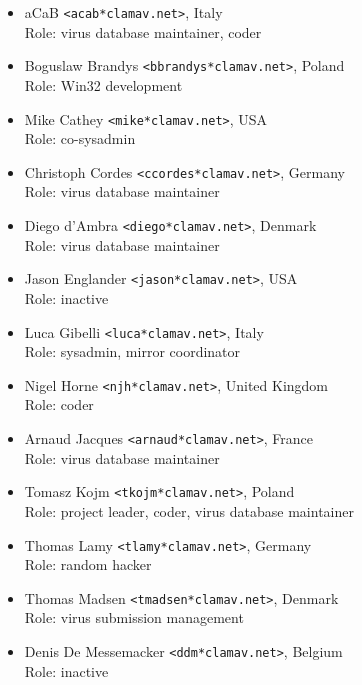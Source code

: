 \documentclass[a4paper,titlepage,12pt]{article}
\newcommand{\email}[1]{\texttt{#1}}
\begin{document}
    \begin{itemize}
	\item aCaB \email{<acab*clamav.net>}, Italy\\
	Role: virus database maintainer, coder

	\item Boguslaw Brandys \email{<bbrandys*clamav.net>}, Poland\\
	Role: Win32 development

	\item Mike Cathey \email{<mike*clamav.net>}, USA\\
	Role: co-sysadmin

	\item Christoph Cordes \email{<ccordes*clamav.net>}, Germany\\
	Role: virus database maintainer

	\item Diego d'Ambra \email{<diego*clamav.net>}, Denmark\\
	Role: virus database maintainer

	\item Jason Englander \email{<jason*clamav.net>}, USA\\
	Role: inactive

	\item Luca Gibelli \email{<luca*clamav.net>}, Italy\\
	Role: sysadmin, mirror coordinator

	\item Nigel Horne \email{<njh*clamav.net>}, United Kingdom\\
	Role: coder

	\item Arnaud Jacques \email{<arnaud*clamav.net>}, France\\
	Role: virus database maintainer

	\item Tomasz Kojm \email{<tkojm*clamav.net>}, Poland\\
	Role: project leader, coder, virus database maintainer

	\item Thomas Lamy \email{<tlamy*clamav.net>}, Germany\\
	Role: random hacker

	\item Thomas Madsen \email{<tmadsen*clamav.net>}, Denmark\\
	Role: virus submission management

	\item Denis De Messemacker \email{<ddm*clamav.net>}, Belgium\\
	Role: inactive


\end{itemize}
\end{document}
